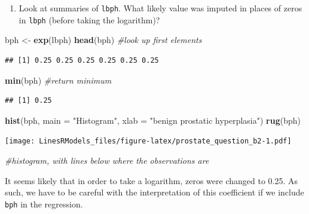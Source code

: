 \documentclass[]{book}
\newenvironment{Shaded}{\begin{snugshade}}{\end{snugshade}}
\newcommand{\KeywordTok}[1]{\textcolor[rgb]{0.13,0.29,0.53}{\textbf{#1}}}
\newcommand{\DataTypeTok}[1]{\textcolor[rgb]{0.13,0.29,0.53}{#1}}
\newcommand{\StringTok}[1]{\textcolor[rgb]{0.31,0.60,0.02}{#1}}
\newcommand{\CommentTok}[1]{\textcolor[rgb]{0.56,0.35,0.01}{\textit{#1}}}
\newcommand{\NormalTok}[1]{#1}
\providecommand{\tightlist}{%
  \setlength{\itemsep}{0pt}\setlength{\parskip}{0pt}}
\theoremstyle{definition}
\theoremstyle{definition}
\theoremstyle{definition}
\theoremstyle{remark}
\begin{document}
\begin{enumerate}
\def\labelenumi{\alph{enumi}.}
\setcounter{enumi}{1}
\tightlist
\item
  Look at summaries of \texttt{lbph}. What likely value was imputed in
  places of zeros in \texttt{lbph} (before taking the logarithm)?
\end{enumerate}

\begin{Shaded}
\begin{Highlighting}[]
\NormalTok{bph <-}\StringTok{ }\KeywordTok{exp}\NormalTok{(lbph) }
\KeywordTok{head}\NormalTok{(bph) }\CommentTok{#look up first elements}
\end{Highlighting}
\end{Shaded}

\begin{verbatim}
## [1] 0.25 0.25 0.25 0.25 0.25 0.25
\end{verbatim}

\begin{Shaded}
\begin{Highlighting}[]
\KeywordTok{min}\NormalTok{(bph) }\CommentTok{#return minimum}
\end{Highlighting}
\end{Shaded}

\begin{verbatim}
## [1] 0.25
\end{verbatim}

\begin{Shaded}
\begin{Highlighting}[]
\KeywordTok{hist}\NormalTok{(bph, }\DataTypeTok{main =} \StringTok{"Histogram"}\NormalTok{, }\DataTypeTok{xlab =} \StringTok{"benign prostatic hyperplasia"}\NormalTok{)}
\KeywordTok{rug}\NormalTok{(bph) }
\end{Highlighting}
\end{Shaded}

\texttt{[image: LinesRModels\_files/figure-latex/prostate\_question\_b2-1.pdf]}

\begin{Shaded}
\begin{Highlighting}[]
\CommentTok{#histogram, with lines below where the observations are}
\end{Highlighting}
\end{Shaded}

It seems likely that in order to take a logarithm, zeros were changed to
0.25. As such, we have to be careful with the interpretation of this
coefficient if we include \texttt{bph} in the regression.
\end{document}
